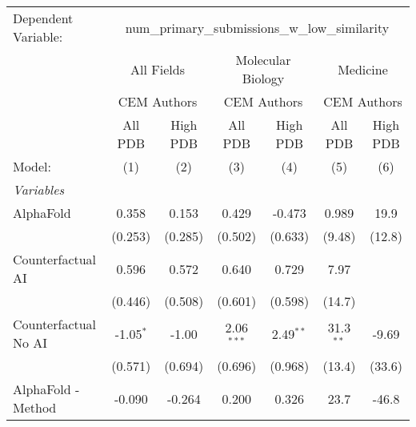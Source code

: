 \begingroup
\centering
\begin{tabular}{lcccccc}
   \tabularnewline \midrule \midrule
   Dependent Variable: & \multicolumn{6}{c}{num\_primary\_submissions\_w\_low\_similarity}\\
 & \multicolumn{2}{c}{All Fields} & \multicolumn{2}{c}{Molecular Biology} & \multicolumn{2}{c}{Medicine} \\
\cmidrule(lr){2-3} \cmidrule(lr){4-5} \cmidrule(lr){6-7}
 & \multicolumn{2}{c}{CEM Authors} & \multicolumn{2}{c}{CEM Authors} & \multicolumn{2}{c}{CEM Authors} \\
\cmidrule(lr){2-3} \cmidrule(lr){4-5} \cmidrule(lr){6-7}
 & \multicolumn{1}{c}{All PDB} & \multicolumn{1}{c}{High PDB} & \multicolumn{1}{c}{All PDB} & \multicolumn{1}{c}{High PDB} & \multicolumn{1}{c}{All PDB} & \multicolumn{1}{c}{High PDB} \\
\cmidrule(lr){2-2} \cmidrule(lr){3-3} \cmidrule(lr){4-4} \cmidrule(lr){5-5} \cmidrule(lr){6-6} \cmidrule(lr){7-7}
   Model:                                                     & (1)           & (2)          & (3)           & (4)           & (5)           & (6)\\  
   \midrule
   \emph{Variables}\\
   AlphaFold                                                  & 0.358         & 0.153        & 0.429         & -0.473        & 0.989         & 19.9\\   
                                                              & (0.253)       & (0.285)      & (0.502)       & (0.633)       & (9.48)        & (12.8)\\   
   Counterfactual AI                                          & 0.596         & 0.572        & 0.640         & 0.729         & 7.97          &   \\   
                                                              & (0.446)       & (0.508)      & (0.601)       & (0.598)       & (14.7)        &   \\   
   Counterfactual No AI                                       & -1.05$^{*}$   & -1.00        & 2.06$^{***}$  & 2.49$^{**}$   & 31.3$^{**}$   & -9.69\\   
                                                              & (0.571)       & (0.694)      & (0.696)       & (0.968)       & (13.4)        & (33.6)\\   
   AlphaFold - Method                                         & -0.090        & -0.264       & 0.200         & 0.326         & 23.7          & -46.8\\   

\end{tabular}
